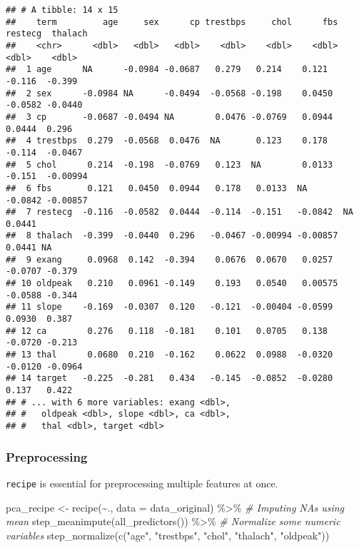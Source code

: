 \documentclass[
]{book}
\newenvironment{Shaded}{\begin{snugshade}}{\end{snugshade}}
\newcommand{\AttributeTok}[1]{\textcolor[rgb]{0.77,0.63,0.00}{#1}}
\newcommand{\CommentTok}[1]{\textcolor[rgb]{0.56,0.35,0.01}{\textit{#1}}}
\newcommand{\FunctionTok}[1]{\textcolor[rgb]{0.00,0.00,0.00}{#1}}
\newcommand{\NormalTok}[1]{#1}
\newcommand{\OtherTok}[1]{\textcolor[rgb]{0.56,0.35,0.01}{#1}}
\newcommand{\SpecialCharTok}[1]{\textcolor[rgb]{0.00,0.00,0.00}{#1}}
\newcommand{\StringTok}[1]{\textcolor[rgb]{0.31,0.60,0.02}{#1}}
\begin{document}
\begin{verbatim}
## # A tibble: 14 x 15
##    term         age     sex      cp trestbps     chol      fbs restecg  thalach
##    <chr>      <dbl>   <dbl>   <dbl>    <dbl>    <dbl>    <dbl>   <dbl>    <dbl>
##  1 age      NA      -0.0984 -0.0687   0.279   0.214    0.121   -0.116  -0.399  
##  2 sex      -0.0984 NA      -0.0494  -0.0568 -0.198    0.0450  -0.0582 -0.0440 
##  3 cp       -0.0687 -0.0494 NA        0.0476 -0.0769   0.0944   0.0444  0.296  
##  4 trestbps  0.279  -0.0568  0.0476  NA       0.123    0.178   -0.114  -0.0467 
##  5 chol      0.214  -0.198  -0.0769   0.123  NA        0.0133  -0.151  -0.00994
##  6 fbs       0.121   0.0450  0.0944   0.178   0.0133  NA       -0.0842 -0.00857
##  7 restecg  -0.116  -0.0582  0.0444  -0.114  -0.151   -0.0842  NA       0.0441 
##  8 thalach  -0.399  -0.0440  0.296   -0.0467 -0.00994 -0.00857  0.0441 NA      
##  9 exang     0.0968  0.142  -0.394    0.0676  0.0670   0.0257  -0.0707 -0.379  
## 10 oldpeak   0.210   0.0961 -0.149    0.193   0.0540   0.00575 -0.0588 -0.344  
## 11 slope    -0.169  -0.0307  0.120   -0.121  -0.00404 -0.0599   0.0930  0.387  
## 12 ca        0.276   0.118  -0.181    0.101   0.0705   0.138   -0.0720 -0.213  
## 13 thal      0.0680  0.210  -0.162    0.0622  0.0988  -0.0320  -0.0120 -0.0964 
## 14 target   -0.225  -0.281   0.434   -0.145  -0.0852  -0.0280   0.137   0.422  
## # ... with 6 more variables: exang <dbl>,
## #   oldpeak <dbl>, slope <dbl>, ca <dbl>,
## #   thal <dbl>, target <dbl>
\end{verbatim}

\hypertarget{preprocessing}{%
\subsubsection{Preprocessing}\label{preprocessing}}

\texttt{recipe} is essential for preprocessing multiple features at once.

\begin{Shaded}
\begin{Highlighting}[]
\NormalTok{pca\_recipe }\OtherTok{\textless{}{-}} \FunctionTok{recipe}\NormalTok{(}\SpecialCharTok{\textasciitilde{}}\NormalTok{., }\AttributeTok{data =}\NormalTok{ data\_original) }\SpecialCharTok{\%\textgreater{}\%}
  \CommentTok{\# Imputing NAs using mean }
  \FunctionTok{step\_meanimpute}\NormalTok{(}\FunctionTok{all\_predictors}\NormalTok{()) }\SpecialCharTok{\%\textgreater{}\%}
  \CommentTok{\# Normalize some numeric variables }
  \FunctionTok{step\_normalize}\NormalTok{(}\FunctionTok{c}\NormalTok{(}\StringTok{"age"}\NormalTok{, }\StringTok{"trestbps"}\NormalTok{, }\StringTok{"chol"}\NormalTok{, }\StringTok{"thalach"}\NormalTok{, }\StringTok{"oldpeak"}\NormalTok{)) }
\end{Highlighting}
\end{Shaded}
\end{document}
